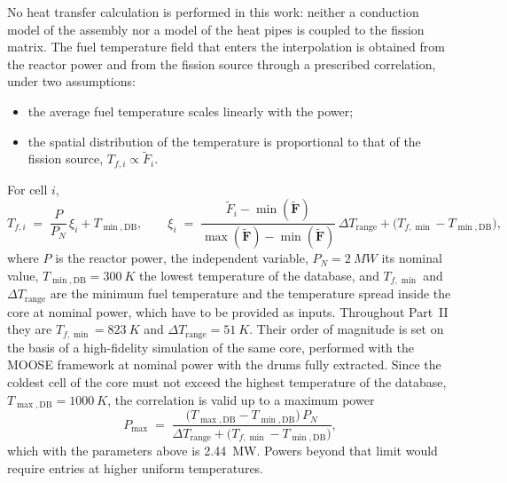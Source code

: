 No heat transfer calculation is performed in this work: neither a conduction model
of the assembly nor a model of the heat pipes is coupled to the fission
matrix. The fuel temperature field that enters the interpolation is obtained
from the reactor power and from the fission source through a prescribed
correlation, under two assumptions:
\begin{itemize}
  \item the average fuel temperature scales linearly with the power;
  \item the spatial distribution of the temperature is proportional to that of
  the fission source, $T_{f,i}\propto\tilde F_i$.
\end{itemize}
For cell $i$,
%
\begin{equation}
  T_{f,i} \;=\; \frac{P}{P_N}\,\xi_i + T_{\min,\mathrm{DB}},
  \qquad
  \xi_i \;=\; \frac{\tilde F_i - \min(\tilde{\mathbf F})}
                   {\max(\tilde{\mathbf F}) - \min(\tilde{\mathbf F})}\,
              \Delta T_{\mathrm{range}} + \big(T_{f,\min} - T_{\min,\mathrm{DB}}\big),
  \label{cs:eq:correlation}
\end{equation}
%
where $P$ is the reactor power, the independent variable, $P_N=\SI{2}{MW}$ its
nominal value, $T_{\min,\mathrm{DB}}=\SI{300}{K}$ the lowest temperature of
the database, and $T_{f,\min}$ and $\Delta T_{\mathrm{range}}$ are the minimum
fuel temperature and the temperature spread inside the core at nominal power,
which have to be provided as inputs. Throughout Part~II they are
$T_{f,\min}=\SI{823}{K}$ and $\Delta T_{\mathrm{range}}=\SI{51}{K}$. Their
order of magnitude is set on the basis of a high-fidelity simulation of the
same core, performed with the MOOSE framework \cite{giudicelli2024moose} at
nominal power with the drums fully extracted. Since the coldest cell of the core must not
exceed the highest temperature of the database, $T_{\max,\mathrm{DB}}=\SI{1000}{K}$,
the correlation is valid up to a maximum power
%
\begin{equation}
  P_{\max} \;=\; \frac{\big(T_{\max,\mathrm{DB}} - T_{\min,\mathrm{DB}}\big)\,P_N}
                      {\Delta T_{\mathrm{range}} + \big(T_{f,\min} - T_{\min,\mathrm{DB}}\big)},
  \label{cs:eq:pmax}
\end{equation}
%
which with the parameters above is \SI{2.44}{MW}. Powers beyond that limit
would require entries at higher uniform temperatures.

